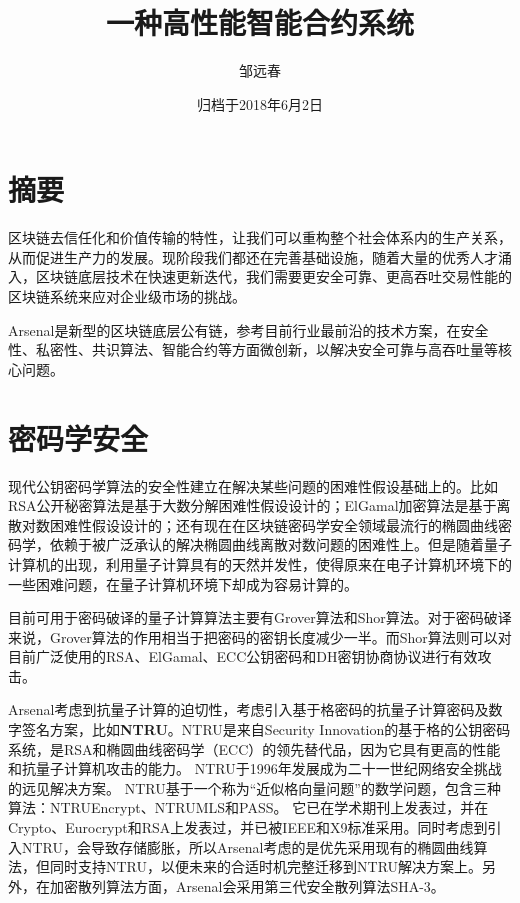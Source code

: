 \documentclass[UTF8]{ctexart}
\title{一种高性能智能合约系统}
\author{邹远春}
\date{归档于2018年6月2日}
\begin{document}
\maketitle

\newcommand\Emph{\textbf}

\tableofcontents

\section{摘要}

区块链去信任化和价值传输的特性，让我们可以重构整个社会体系内的生产关系，从而促进生产力的发展。现阶段我们都还在完善基础设施，随着大量的优秀人才涌入，区块链底层技术在快速更新迭代，我们需要更安全可靠、更高吞吐交易性能的区块链系统来应对企业级市场的挑战。

Arsenal是新型的区块链底层公有链，参考目前行业最前沿的技术方案，在安全性、私密性、共识算法、智能合约等方面微创新，以解决安全可靠与高吞吐量等核心问题。

\section{密码学安全}

现代公钥密码学算法的安全性建立在解决某些问题的困难性假设基础上的。比如RSA公开秘密算法是基于大数分解困难性假设设计的；ElGamal加密算法是基于离散对数困难性假设设计的；还有现在在区块链密码学安全领域最流行的椭圆曲线密码学，依赖于被广泛承认的解决椭圆曲线离散对数问题的困难性上。但是随着量子计算机的出现，利用量子计算具有的天然并发性，使得原来在电子计算机环境下的一些困难问题，在量子计算机环境下却成为容易计算的。

目前可用于密码破译的量子计算算法主要有Grover算法和Shor算法。对于密码破译来说，Grover算法的作用相当于把密码的密钥长度减少一半。而Shor算法则可以对目前广泛使用的RSA、ElGamal、ECC公钥密码和DH密钥协商协议进行有效攻击。

Arsenal考虑到抗量子计算的迫切性，考虑引入基于格密码的抗量子计算密码及数字签名方案，比如\Emph{NTRU}。NTRU是来自Security Innovation的基于格的公钥密码系统，是RSA和椭圆曲线密码学（ECC）的领先替代品，因为它具有更高的性能和抗量子计算机攻击的能力。 NTRU于1996年发展成为二十一世纪网络安全挑战的远见解决方案。 NTRU基于一个称为“近似格向量问题”的数学问题，包含三种算法：NTRUEncrypt、NTRUMLS和PASS。 它已在学术期刊上发表过，并在Crypto、Eurocrypt和RSA上发表过，并已被IEEE和X9标准采用。同时考虑到引入NTRU，会导致存储膨胀，所以Arsenal考虑的是优先采用现有的椭圆曲线算法，但同时支持NTRU，以便未来的合适时机完整迁移到NTRU解决方案上。另外，在加密散列算法方面，Arsenal会采用第三代安全散列算法SHA-3。
\end{document}
